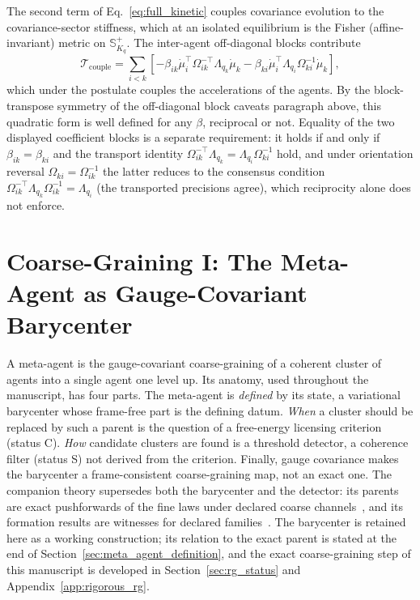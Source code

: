 \documentclass[11pt]{article}
\begin{document}
The second term of Eq.~\eqref{eq:full_kinetic} couples covariance evolution to the covariance-sector stiffness, which at an isolated equilibrium is the Fisher (affine-invariant) metric on $\mathbb{S}^+_{K_q}$. The inter-agent off-diagonal blocks contribute
\begin{equation}
\mathcal{T}_{\mathrm{couple}} = \sum_{i < k}\left[-\beta_{ik}\dot{\mu}_i^\top \Omega_{ik}^{-\top}\Lambda_{q_k}\dot{\mu}_k - \beta_{ki}\dot{\mu}_i^\top \Lambda_{q_i}\Omega_{ki}^{-1} \dot{\mu}_k\right],
\end{equation}
which under the postulate couples the accelerations of the agents. By the block-transpose symmetry of the off-diagonal block caveats paragraph above, this quadratic form is well defined for any $\beta$, reciprocal or not. Equality of the two displayed coefficient blocks is a separate requirement: it holds if and only if $\beta_{ik} = \beta_{ki}$ and the transport identity $\Omega_{ik}^{-\top}\Lambda_{q_k} = \Lambda_{q_i}\Omega_{ki}^{-1}$ hold, and under orientation reversal $\Omega_{ki} = \Omega_{ik}^{-1}$ the latter reduces to the consensus condition $\Omega_{ik}^{-\top}\Lambda_{q_k}\Omega_{ik}^{-1} = \Lambda_{q_i}$ (the transported precisions agree), which reciprocity alone does not enforce.
\section{Coarse-Graining I: The Meta-Agent as Gauge-Covariant Barycenter}\label{sec:meta_agent_formation}

A meta-agent is the gauge-covariant coarse-graining of a coherent cluster of agents into a single agent one level up. Its anatomy, used throughout the manuscript, has four parts. The meta-agent is \emph{defined} by its state, a variational barycenter whose frame-free part is the defining datum. \emph{When} a cluster should be replaced by such a parent is the question of a free-energy licensing criterion (status C). \emph{How} candidate clusters are found is a threshold detector, a coherence filter (status S) not derived from the criterion. Finally, gauge covariance makes the barycenter a frame-consistent coarse-graining map, not an exact one. The companion theory supersedes both the barycenter and the detector: its parents are exact pushforwards of the fine laws under declared coarse channels~\cite[Chs.~9 and~11]{DennisGaugeVFE2026}, and its formation results are witnesses for declared families~\cite[Ch.~13]{DennisGaugeVFE2026}. The barycenter is retained here as a working construction; its relation to the exact parent is stated at the end of Section~\ref{sec:meta_agent_definition}, and the exact coarse-graining step of this manuscript is developed in Section~\ref{sec:rg_status} and Appendix~\ref{app:rigorous_rg}.
\end{document}
